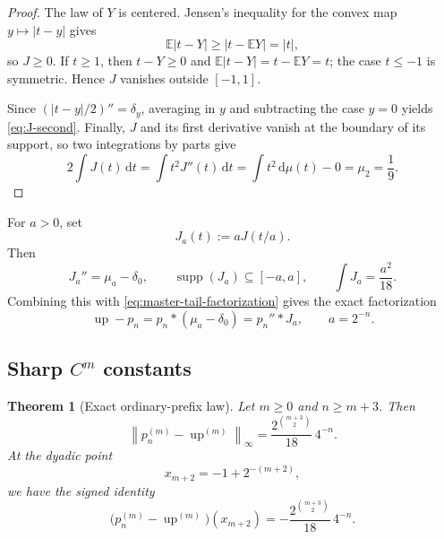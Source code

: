 \documentclass[11pt]{article}
\numberwithin{equation}{section}
\newtheorem{theorem}{Theorem}[section]
\theoremstyle{definition}
\theoremstyle{remark}
\DeclareMathOperator{\supp}{supp}
\newcommand{\E}{\mathbb E}
\newcommand{\Up}{\operatorname{up}}
\newcommand{\dd}{\,\mathrm d}
\newcommand{\abs}[1]{\left|#1\right|}
\newcommand{\norm}[1]{\left\lVert#1\right\rVert}
\begin{document}
\begin{proof}
The law of $Y$ is centered.  Jensen's inequality for the convex map $y\mapsto\abs{t-y}$ gives
\[
 \E\abs{t-Y}\ge\abs{t-\E Y}=\abs t,
\]
so $J\ge0$.  If $t\ge1$, then $t-Y\ge0$ and
\(\E\abs{t-Y}=t-\E Y=t\); the case $t\le-1$ is symmetric.  Hence $J$ vanishes outside $[-1,1]$.

Since \((\abs{t-y}/2)''=\delta_y\), averaging in $y$ and subtracting the case $y=0$ yields \eqref{eq:J-second}.  Finally, $J$ and its first derivative vanish at the boundary of its support, so two integrations by parts give
\[
 2\int J(t)\dd t
 =\int t^2J''(t)\dd t
 =\int t^2\dd\mu(t)-0
 =\mu_2=\frac19.
\]
\end{proof}

For $a>0$, set
\begin{equation}
 J_a(t):=aJ(t/a).
 \label{eq:Ja}
\end{equation}
Then
\begin{equation}
 J_a''=\mu_a-\delta_0,
 \qquad
 \supp(J_a)\subseteq[-a,a],
 \qquad
 \int J_a=\frac{a^2}{18}.
 \label{eq:Ja-properties}
\end{equation}
Combining this with \eqref{eq:master-tail-factorization} gives the exact factorization
\begin{equation}
 \boxed{\Up-p_n=p_n*(\mu_a-\delta_0)=p_n''*J_a,\qquad a=2^{-n}.}
 \label{eq:ordinary-factorization}
\end{equation}

\subsection{Sharp $C^m$ constants}

\begin{theorem}[Exact ordinary-prefix law]
\label{thm:ordinary-exact}
Let $m\ge0$ and $n\ge m+3$.  Then
\begin{equation}
 \boxed{
 \norm{p_n^{(m)}-\Up^{(m)}}_\infty
 =\frac{2^{\binom{m+3}{2}}}{18}\,4^{-n}.}
 \label{eq:ordinary-exact}
\end{equation}
At the dyadic point
\begin{equation}
 x_{m+2}=-1+2^{-(m+2)},
 \label{eq:ordinary-extremal-point}
\end{equation}
we have the signed identity
\begin{equation}
 \boxed{
 \bigl(p_n^{(m)}-\Up^{(m)}\bigr)(x_{m+2})
 =-\frac{2^{\binom{m+3}{2}}}{18}\,4^{-n}.}
 \label{eq:ordinary-signed}
\end{equation}
\end{theorem}
\end{document}
